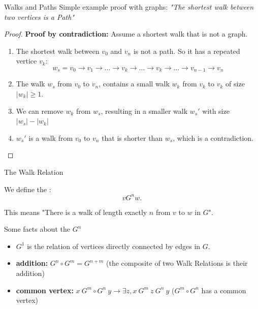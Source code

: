 \begin{frame}{Walks and Paths}
  Simple example proof with graphs: \emph{"The shortest walk between two vertices is a Path"}

  \begin{proof}
    {\bf Proof by contradiction:} Assume a shortest walk that is not a graph.

    \begin{enumerate}
    \item The shortest walk between $v_0$ and $v_n$ is not a path. So it has a repeated vertice $v_k$:
    \begin{equation*}
      w_s = v_0 \to v_1 \to \ldots \to v_k \to \ldots \to v_k \to \ldots \to v_{n-1} \to v_n
    \end{equation*}

    \item The walk $w_s$ from $v_0$ to $v_n$, contains a small walk $w_k$ from $v_k$ to $v_k$ of size $|w_k| \geq 1$.
    \item We can remove $w_k$ from $w_s$, resulting in a smaller walk $w_s'$ with size $|w_s| - |w_k|$
    \item $w_s'$ is a walk from $v_0$ to $v_n$ that is shorter than $w_s$, which is a contradiction.
    \end{enumerate}
  \end{proof}

\end{frame}

\begin{frame}{The Walk Relation}

  We define the :
  \begin{equation}
    v G^n w.
  \end{equation}\bigskip

  This means "There is a walk of length exactly $n$ from $v$ to $w$ in $G$".\bigskip

  Some facts about the $G^n$
  \begin{itemize}
  \item $G^1$ is the relation of vertices directly connected by edges in $G$.
  \item {\bf addition:} $G^n \circ G^m = G^{n+m}$ \hspace{.5cm}
    (the composite of two Walk Relations is their addition)
  \item {\bf common vertex:} $x~G^m \circ G^n~y \rightarrow \exists z, x~G^m~z~G^n~y$
    \hfill ($G^m\circ G^n$ has a common vertex)
  \end{itemize}
\end{frame}

